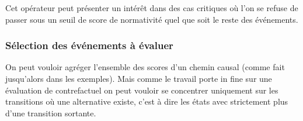 \documentclass[11pt]{extarticle}
\begin{document}
Cet opérateur peut présenter un intérêt dans des cas critiques où l'on se refuse de passer sous un seuil de score de normativité quel que soit le reste des événements. 

\subsubsection{Sélection des événements à évaluer}

On peut vouloir agréger l'ensemble des scores d'un chemin causal (comme fait jusqu'alors dans les exemples). Mais comme le travail porte in fine sur une évaluation de contrefactuel on peut vouloir se concentrer uniquement sur les transitions où une alternative existe, c'est à dire les états avec strictement plus d'une transition sortante. 
\end{document}
